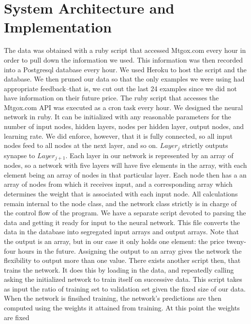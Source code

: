 \documentclass[a4paper,10pt]{article}
\begin{document}
\section{System Architecture and Implementation}
The data was obtained with a ruby script that accessed Mtgox.com every hour in order to pull down the information we used.
This information was then recorded into a Postgresql database every hour.  We used Heroku to host the script and the database.
We then pruned our data so that the only examples we were using had appropriate feedback--that is, we cut out the last 24 examples
since we did not have information on their future price.  The ruby script that accesses the Mtgox.com API was executed as a cron
task every hour.  
\newline \newline We designed the neural network in ruby.  It can be initialized with any reasonable parameters
for the number of input nodes, hidden layers, nodes per hidden layer, output nodes, and learning rate.  We did enforce, however,
that it is fully connected, so all input nodes feed to all nodes at the next layer, and so on.  $Layer_{j}$ strictly outputs
synapse to $Layer_{j + 1}$.  Each layer in our network is represented by an array of nodes, so a network with five layers
will have five elements in the array, with each element being an array of nodes in that particular layer.  Each node then
has a an array of nodes from which it receives input, and a corresponding array which determines the weight that is associated
with each input node.  All calculations remain internal to the node class, and the network class strictly is in charge
of the control flow of the program.
\newline \newline
We have a separate script devoted to parsing the data and getting it ready for input to the neural network.  This file converts
the data in the database into segregated input arrays and output arrays.  Note that the output is an array, but in our case it
only holds one element: the price tweny-four hours in the future.  Assigning the output to an array gives the network the
flexibility to output more than one value.  There exists another script then, that trains the network.  It does this by loading
in the data, and repeatedly calling asking the initialized network to train itself on successive data.  This script takes
as input the ratio of training set to validation set given the fixed size of our data.  When the network is finsihed training,
the network's predictions are then computed using the weights it attained from training.  At this point the weights are fixed
\end{document}
